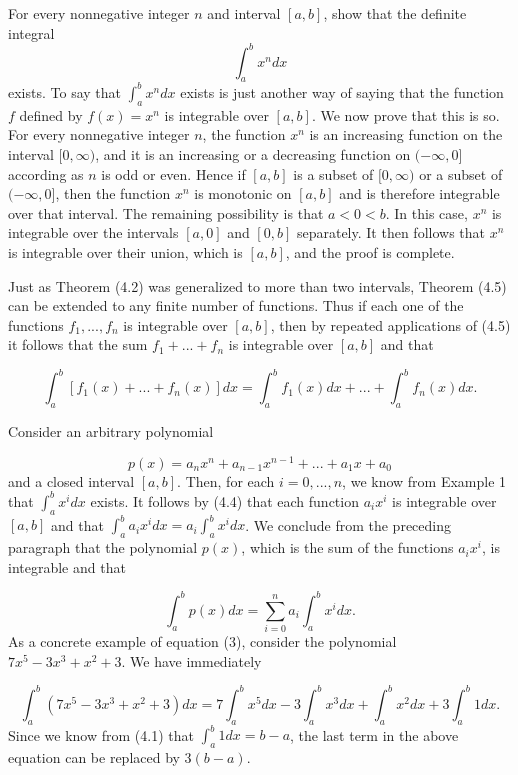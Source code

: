  \begin{example}
For every nonnegative integer $n$ and interval $[a, b]$, show that the definite integral
$$
 \int_{a}^{b} x^{n} dx
$$
\noindent exists. To say that $\int_{a}^{b} x^{n} dx$ exists is just another way of saying that the function $f$ defined by $f(x) = x^n$ is integrable over $[a, b]$. We now prove that this is so. For every nonnegative integer $n$, the function $x^n$ is an increasing function on the interval $[0, \infty)$, and it is an increasing or a decreasing function on $(-\infty, 0]$ according as $n$ is odd or even. Hence if $[a, b]$ is a subset of $[0, \infty)$ or a subset of $(-\infty, 0]$, then the function $x^n$ is monotonic on $[a, b]$ and is
therefore integrable over that interval. The remaining possibility is that
$a < 0 < b$. In this case, $x^n$ is integrable over the intervals $[a, 0]$ and $[0, b]$ separately. It then follows that $x^n$ is integrable over their union, which is $[a, b]$, and the proof is complete.
\end{example}
\medskip

Just as Theorem (4.2) was generalized to more than two intervals, Theorem (4.5) can be extended to any finite number of functions. Thus if each one of the functions $f_{1}, ..., f_{n}$ is integrable over $[a, b]$, then by repeated
applications of (4.5) it follows that the sum $f_{1} + ... + f_{n}$ is integrable over $[a, b]$ and that

\begin{equation}
\int_{a}^{b} [f_{1}(x) + ... + f_{n}(x)] dx = \int_{a}^{b} f_{1}(x) dx +... + \int_{a}^{b} f_{n}(x) dx. 
\label{eq4.4.2}
\end{equation}

\begin{example}
Consider an arbitrary polynomial 

$$
p(x) = a_{n}x^{n} + a_{n-1} x^{n - 1} + ... + a_{1}x + a_0
$$
\noindent and a closed interval $[a, b]$. Then, for each $i = 0,... , n$, we know from Example 1 that $\int_{a}^{b} x^{i }dx$ exists. It follows by (4.4) that each function $a_{i}x^{i}$ is integrable over $[a, b]$ and that $\int_{a}^{b} a_{i}x^{i}dx = a_{i }\int_{a}^{b} x^{i} dx$. We conclude from the preceding
paragraph that the polynomial $p(x)$, which is the sum of the functions $a_{i}x^{i}$, is integrable and that 

\begin{equation}
\int_{a}^{b}  p(x) dx = \sum_{i = 0}^{n} a_{i} \int_{a}^{b} x^{i} dx.  
\label{eq4.4.3}
\end{equation}
\noindent As a concrete example of equation (3), consider the polynomial $7x^5 - 3x^3 + x^2 + 3$. We have immediately 

$$
\int_{a}^{b} (7x^5 - 3x^3 + x^2 + 3) dx
= 7 \int_{a}^{b} x^5 dx - 3 \int_{a}^{b} x^3 dx + \int_{a}^{b} x^{2} dx + 3 \int_{a}^{b} 1 dx.
$$
\noindent Since we know from (4.1) that $\int_{a}^{b} 1 dx = b - a$, the last term in the above equation can be replaced by $3(b - a)$.
\end{example}

